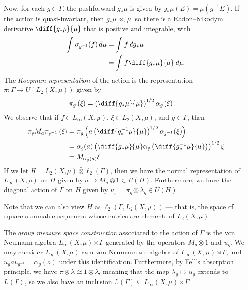 \documentclass[10pt]{mypackage}
\begin{document}
Now, for each $g\in \Gamma$, the pushforward $g_{\ast}\mu$ is given by $g_{\ast}\mu\left( E \right) = \mu\left( g^{-1}E \right)$. If the action is quasi-invariant, then $g_{\ast}\mu\ll\mu$, so there is a Radon--Nikodym derivative $ \diff{g_{\ast}\mu}{\mu} $ that is positive and integrable, with
\begin{align*}
  \int_{}^{} \sigma_{g^{-1}}(f)\:d\mu &= \int_{}^{} f\:dg_{\ast}\mu\\
                                      &= \int_{}^{} f\diff{g_{\ast}\mu}{\mu}\:d\mu.
\end{align*}
The \textit{Koopman representation} of the action is the representation $\pi\colon \Gamma\rightarrow U\left( L_2\left( X,\mu \right) \right)$ given by
\begin{align*}
  \pi_g\left( \xi \right) &= \left( \diff{g_{\ast}\mu}{\mu} \right)^{1/2}\alpha_g\left(\xi\right).
\end{align*}
We observe that if $f\in L_{\infty}\left( X,\mu \right)$, $\xi\in L_2\left( X,\mu \right)$, and $g\in \Gamma$, then
\begin{align*}
  \pi_g M_a \pi_{g^{-1}}\left( \xi \right) &= \pi_g\left( a \left( \diff{g^{-1}_{\ast}\mu}{\mu} \right)^{1/2}\alpha_{g^{-1}}(\xi) \right)\\
                            &= \alpha_g(a) \left( \diff{g_{\ast}\mu}{\mu}\alpha_g\left( \diff{g^{-1}_{\ast}\mu}{\mu} \right) \right)^{1/2}\xi\\
                            &= M_{\alpha_g(a)}\xi
\end{align*}
If we let $H = L_2\left( X,\mu \right)\bar\otimes \ell_2\left( \Gamma \right)$, then we have the normal representation of $L_{\infty}\left( X,\mu \right)$ on $H$ given by $a\mapsto M_a\otimes 1\in B(H)$. Furthermore, we have the diagonal action of $\Gamma$ on $H$ given by $u_g = \pi_g\otimes \lambda_g\in U(H)$.
\begin{remark}
  Note that we can also view $H$ as $\ell_2\left( \Gamma,L_2\left( X,\mu \right) \right)$ --- that is, the space of square-summable sequences whose entries are elements of $L_2\left( X,\mu \right)$.
\end{remark}
The \textit{group measure space construction} associated to the action of $\Gamma$ is the von Neumann algebra $L_{\infty}\left( X,\mu \right)\rtimes \Gamma$ generated by the operators $M_a\otimes 1$ and $u_g$. We may consider $L_{\infty}\left( X,\mu \right)$ as a von Neumann subalgebra of $L_{\infty}\left( X,\mu \right)\rtimes \Gamma$, and $u_g a u_{g^{-1}} = \alpha_g(a)$ under this identification. Furthermore, by Fell's absorption principle, we have $\pi\otimes \lambda \cong 1\otimes \lambda$, meaning that the map $\lambda_g\mapsto u_g$ extends to $L\left( \Gamma \right)$, so we also have an inclusion $L\left( \Gamma \right)\subseteq L_{\infty}\left( X,\mu \right)\rtimes \Gamma$.
\end{document}
